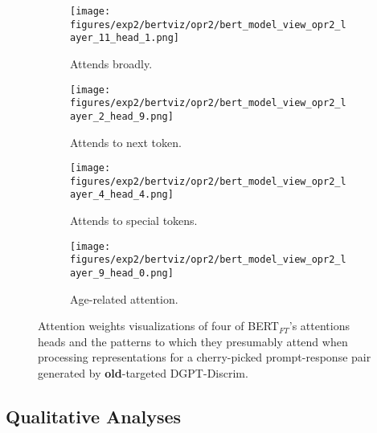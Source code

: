 \begin{figure}[H]
     \centering
     \begin{subfigure}[b]{0.22\textwidth}
        \centering
        \texttt{[image: figures/exp2/bertviz/opr2/bert\_model\_view\_opr2\_layer\_11\_head\_1.png]}
        \captionsetup{font=footnotesize,labelfont=footnotesize}
        \caption{Attends broadly.}
        \label{subfig:bertviz_model_view_opr2_broad}
     \end{subfigure}
     \quad
     \begin{subfigure}[b]{0.22\textwidth}
        \centering
        \texttt{[image: figures/exp2/bertviz/opr2/bert\_model\_view\_opr2\_layer\_2\_head\_9.png]}
        \captionsetup{font=footnotesize,labelfont=footnotesize}
        \caption{Attends to next token.}
        \label{subfig:bertviz_model_view_opr2_next}
     \end{subfigure}
    \quad
    \begin{subfigure}[b]{0.22\textwidth}
        \centering
        \texttt{[image: figures/exp2/bertviz/opr2/bert\_model\_view\_opr2\_layer\_4\_head\_4.png]}
        \captionsetup{font=footnotesize,labelfont=footnotesize}
        \caption{Attends to special tokens.}
        \label{subfig:bertviz_model_view_opr2_special}
     \end{subfigure}
    \quad
     \begin{subfigure}[b]{0.22\textwidth}
        \centering
        \texttt{[image: figures/exp2/bertviz/opr2/bert\_model\_view\_opr2\_layer\_9\_head\_0.png]}
        \captionsetup{font=footnotesize,labelfont=footnotesize}
        \caption{Age-related attention.}
        \label{subfig:bertviz_model_view_opr2_age}
     \end{subfigure}
    \caption{Attention weights visualizations of four of BERT$_{FT}$'s attentions heads and the patterns to which they presumably attend when processing representations for a cherry-picked prompt-response pair generated by \textbf{old}-targeted DGPT-Discrim.}
    \label{fig:bertviz_model_view_opr2}
\end{figure}

\subsection{Qualitative Analyses}
\label{subsec:ctg_anal_qualitative}


